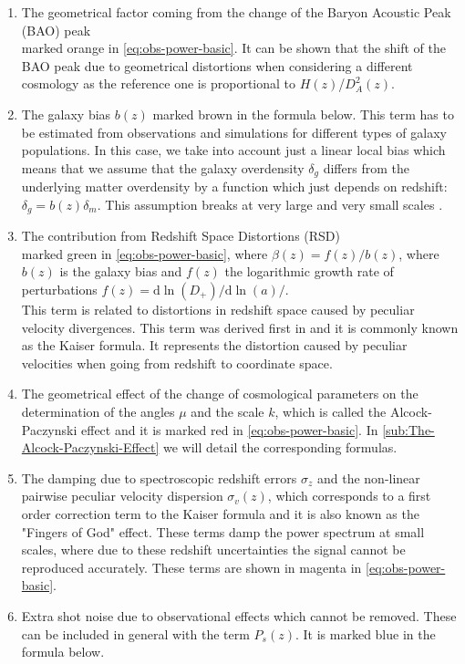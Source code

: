 \begin{enumerate}
\item The geometrical factor coming from the change of the Baryon Acoustic Peak (BAO) peak \\ marked orange
in \cref{eq:obs-power-basic}. It can be shown \cite{cite some BAO review} that the 
shift of the BAO peak due to geometrical distortions when considering a different cosmology
as the reference one is proportional to $H(z)$/$D^2_{A}(z)$.
\item The galaxy bias $b(z)$ marked brown in the formula below.
This term has to be estimated from observations and simulations
for different types of galaxy populations. In this case, we take into account
just a linear local bias which means that we assume that the galaxy overdensity $\delta_g$ differs from the 
underlying matter overdensity by a function which just depends on redshift: $\delta_g = b(z) \delta_m$.
This assumption breaks at very large and very small scales \cite{cite some bias review}.
\item The contribution from Redshift Space Distortions (RSD) \\
marked green in \cref{eq:obs-power-basic}, where $\beta(z) = f(z)/b(z)$, where
$b(z)$ is the galaxy bias and $f(z)$ the logarithmic growth rate of perturbations $f(z)=\mathrm{d}\ln(D_+)/\mathrm{d}\ln(a)/$.\\
This term is related to distortions in redshift space caused by peculiar velocity divergences. This term was derived first in
\citep{kaiser_clustering_1987} and it is commonly known as the Kaiser formula.
It represents the distortion caused by peculiar velocities when going from redshift to 
coordinate space.
\item The geometrical effect of the change of cosmological parameters
on the determination of the angles $\mu$ and the scale $k$, which is called the
Alcock-Paczynski effect \citep{alcock1979anevolution, ballinger_measuring_1996, feldman_power_1994} and it is marked red in \cref{eq:obs-power-basic}.
In \cref{sub:The-Alcock-Paczynski-Effect} we will detail the corresponding formulas.
\item The damping due to spectroscopic redshift errors $\sigma_{z}$ and the non-linear pairwise peculiar
velocity dispersion $\sigma_{v}(z)$, which corresponds to a first order correction
term to the Kaiser formula and it is also known as the "Fingers of God" effect. These terms damp the power spectrum at small scales, where due to these redshift
uncertainties the signal cannot be reproduced accurately. These terms are shown in magenta in \cref{eq:obs-power-basic}. 
\item Extra shot noise due to observational effects which cannot be removed. These can be included
in general with the term $P_{s}(z)$. It is marked blue in the formula below.
\end{enumerate}
